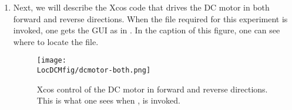 \begin{enumerate}
        
        
        
  \item Next, we will describe the Xcos code that drives the DC motor in
        both forward and reverse directions.  When the file required for
        this experiment is invoked, one gets the GUI as in
        .  In the caption of this figure, one can
        see where to locate the file.
        
        \begin{figure}
          \centering
          \texttt{[image: \\LocDCMfig/dcmotor-both.png]}
          \caption[Xcos control of the DC motor in forward and reverse
            directions]{Xcos control of the DC motor in forward and reverse
            directions.  This is what one sees when
            , is invoked.}
          \label{fig:dcmotor-both}
        \end{figure}
        

\end{enumerate}
